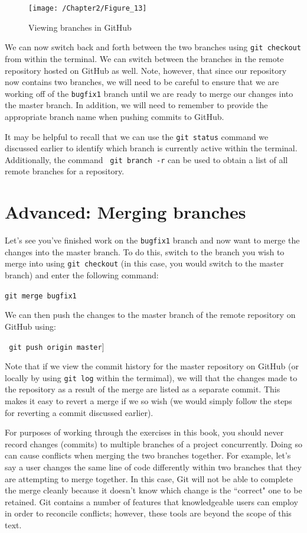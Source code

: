 \documentclass{book}
\begin{document}
\begin{figure}[h]
	\caption{Viewing branches in GitHub}
	\centering\texttt{[image: /Chapter2/Figure\_13]}
\end{figure}

We can now switch back and forth between the two branches using \texttt{git checkout} from within the terminal. We can switch between the branches in the remote repository hosted on GitHub as well. Note, however, that since our repository now contains two branches, we will need to be careful to ensure that we are working off of the \texttt{bugfix1} branch until we are ready to merge our changes into the master branch. In addition, we will need to remember to provide the appropriate branch name when pushing commits to GitHub.

It may be helpful to recall that we can use the \texttt{git status} command we discussed earlier to identify which branch is currently active within the terminal. Additionally, the command \texttt{ git branch -r} can be used to obtain a list of all remote branches for a repository.

\section{Advanced: Merging branches}

Let's see you've finished work on the \texttt{bugfix1} branch and now want to merge the changes into the master branch. To do this, switch to the branch you wish to merge into using \texttt{git checkout} (in this case, you would switch to the master branch) and enter the following command:

\texttt{git merge bugfix1}

We can then push the changes to the master branch of the remote repository on GitHub using:

\texttt{ git push origin master}]

Note that if we view the commit history for the master repository on GitHub (or locally by using \texttt{git log} within the termimal), we will that the changes made to the repository as a result of the merge are listed as a separate commit. This makes it easy to revert a merge if we so wish (we would simply follow the steps for reverting a commit discussed earlier).

For purposes of working through the exercises in this book, you should never record changes (commits) to multiple branches of a project concurrently. Doing so can cause conflicts when merging the two branches together. For example, let's say a user changes the same line of code differently within two branches that they are attempting to merge together. In this case, Git will not be able to complete the merge cleanly because it doesn't know which change is the ``correct" one to be retained. Git contains a number of features that knowledgeable users can employ in order to reconcile conflicts; however, these tools are beyond the scope of this text.
\end{document}

